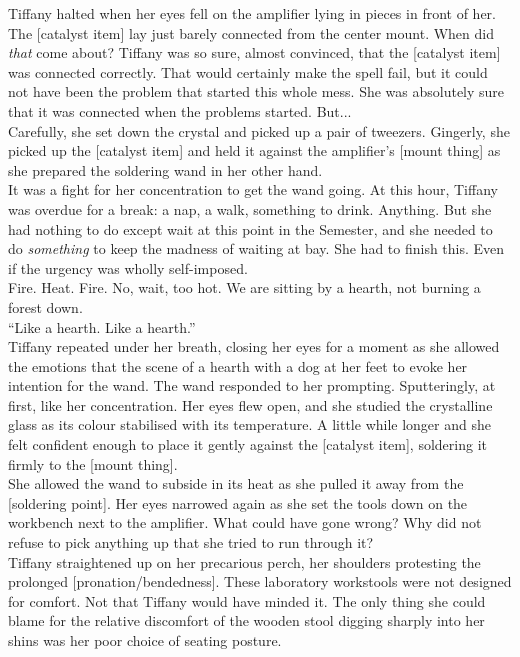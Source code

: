Tiffany halted when her eyes fell on the amplifier lying in pieces in front of her. 
The [catalyst item] lay just barely connected from the center mount. 
When did \textit{that} come about? Tiffany was so sure, almost convinced, that the [catalyst item] was connected correctly.
That would certainly make the spell fail, but it could not have been the problem that started this whole mess. 
She was absolutely sure that it was connected when the problems started. But...\\

Carefully, she set down the crystal and picked up a pair of tweezers. 
Gingerly, she picked up the [catalyst item] and held it against the amplifier's [mount thing] as she prepared the soldering wand in her other hand.\\

It was a fight for her concentration to get the wand going.
At this hour, Tiffany was overdue for a break: a nap, a walk, something to drink.
Anything.
But she had nothing to do except wait at this point in the Semester, and she needed to do \textit{something} to keep the madness of waiting at bay.
She had to finish this.
Even if the urgency was wholly self-imposed.\\

Fire. Heat. Fire. No, wait, too hot. We are sitting by a hearth, not burning a forest down.\\

``Like a hearth. Like a hearth.''\\
Tiffany repeated under her breath, closing her eyes for a moment as she allowed the emotions that the scene of a hearth with a dog at her feet to evoke her intention for the wand.
The wand responded to her prompting.
Sputteringly, at first, like her concentration. 
Her eyes flew open, and she studied the crystalline glass as its colour stabilised with its temperature.
A little while longer and she felt confident enough to place it gently against the [catalyst item], soldering it firmly to the [mount thing].\\

She allowed the wand to subside in its heat as she pulled it away from the [soldering point].
Her eyes narrowed again as she set the tools down on the workbench next to the amplifier.
What could have gone wrong?
Why did not refuse to pick anything up that she tried to run through it?\\

Tiffany straightened up on her precarious perch, her shoulders protesting the prolonged [pronation/bendedness].
These laboratory workstools were not designed for comfort.
Not that Tiffany would have minded it.
The only thing she could blame for the relative discomfort of the wooden stool digging sharply into her shins was her poor choice of seating posture.\\

